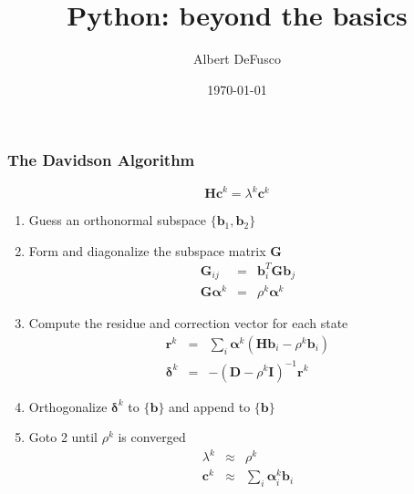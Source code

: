 \documentclass[xcolor=table,10pt,final]{beamer}
\begin{document}
\title{Python: beyond the basics}
\author{Albert DeFusco}
\date{\today}


\frame{\titlepage}

\begin{frame}[fragile]
  \frametitle{The Davidson Algorithm}
  \begin{equation*}
    \mathbf{Hc}^k = \lambda^k\mathbf{c}^k
  \end{equation*}
  \begin{enumerate}
    \item Guess an orthonormal subspace $\{\mathbf{b}_1,\mathbf{b}_2\}$
    \item Form and diagonalize the subspace matrix $\mathbf{G}$
      \begin{eqnarray*}
        \mathbf{G}_{ij} &=& \mathbf{b}_i^T\mathbf{Gb}_j\\
        \mathbf{G}\boldsymbol{\alpha}^k &=&  \rho^k\boldsymbol{\alpha}^k
      \end{eqnarray*}
    \item Compute the residue and correction vector for each state
      \begin{eqnarray*}
        \mathbf{r}^k &=& \sum_{i}\boldsymbol{\alpha}^k\left(\mathbf{Hb}_i - \rho^k\mathbf{b}_i\right)\\
        \boldsymbol{\delta}^k &=& -\left(\mathbf{D}-\rho^k\mathbf{I}\right)^{-1}\mathbf{r}^k
        \end{eqnarray*}
      \item Orthogonalize $\boldsymbol{\delta}^k$ to $\{\mathbf{b}\}$ and append to $\{\mathbf{b}\}$
      \item Goto 2 until $\rho^k$ is converged
        \begin{eqnarray*}
          \lambda^k &\approx& \rho^k\\
          \mathbf{c}^k &\approx& \sum_i\boldsymbol{\alpha}_i^k\mathbf{b}_i
        \end{eqnarray*}
  \end{enumerate}
\end{frame}
\end{document}
